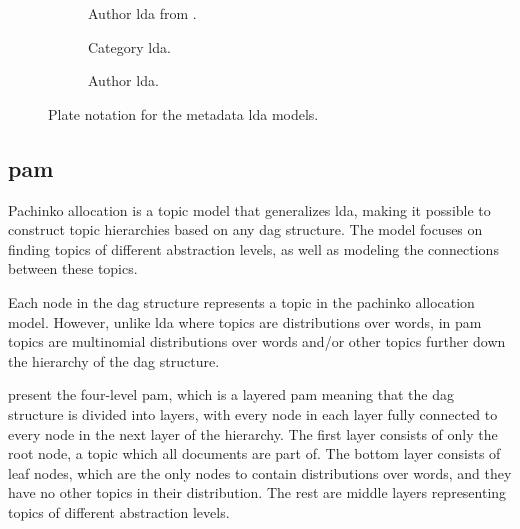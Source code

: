 \begin{figure*}[ht]
	\centering
	\begin{subfigure}{0.275\textwidth}
		\centering
		\resizebox{\textwidth}{!}{%
			
		}
		\caption{Author \gls{lda} from \cite{author_topic_2012}.}
		\label{fig:original_author_lda}
	\end{subfigure}
	\hspace{2em}
	\begin{subfigure}{0.275\textwidth}
		\centering
		\resizebox{\textwidth}{!}{%
			
		}
		\caption{Category \gls{lda}.}
		\label{fig:category_lda}
	\end{subfigure}
	\hspace{2em}
	\begin{subfigure}{0.275\textwidth}
		\centering
		\resizebox{\textwidth}{!}{%
			
		}
		\caption{Author \gls{lda}.}
		\label{fig:author_lda}
	\end{subfigure}	
	\caption{Plate notation for the metadata \gls{lda} models.}
	\label{fig:metadata_lda}
\end{figure*}

\subsection{\acrlong{pam}}\label{subsec:pachinko_prelim}
Pachinko allocation is a topic model that generalizes \gls{lda}, making it possible to construct topic hierarchies based on any \gls{dag} structure.
The model focuses on finding topics of different abstraction levels, as well as modeling the connections between these topics.

Each node in the \gls{dag} structure represents a topic in the pachinko allocation model. 
However, unlike \gls{lda} where topics are distributions over words, in \gls{pam} topics are multinomial distributions over words and/or other topics further down the hierarchy of the \gls{dag} structure.

\citet{li2006pachinko} present the four-level \gls{pam}, which is a layered \gls{pam} meaning that the \gls{dag} structure is divided into layers, with every node in each layer fully connected to every node in the next layer of the hierarchy.
The first layer consists of only the root node, a topic which all documents are part of.
The bottom layer consists of leaf nodes, which are the only nodes to contain distributions over words, and they have no other topics in their distribution.
The rest are middle layers representing topics of different abstraction levels.

